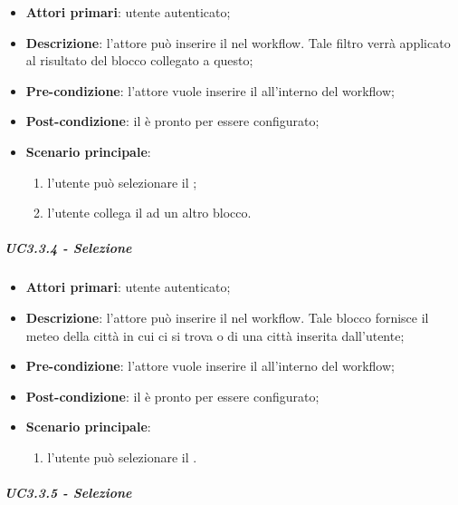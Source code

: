 \begin{itemize}
\item \textbf{Attori primari}:  utente autenticato;

\item \textbf{Descrizione}: l'attore può inserire il \BFiltro{} nel workflow. Tale filtro verrà applicato al risultato del blocco collegato a questo;

\item \textbf{Pre-condizione}: l'attore vuole inserire il \BFiltro{} all'interno del workflow;

\item \textbf{Post-condizione}:  il \BFiltro{} è pronto per essere configurato;

\item \textbf{Scenario principale}:
\begin{enumerate}
\item l'utente può selezionare il \BFiltro{};
\item l'utente collega il \BFiltro{} ad un altro blocco.
\end{enumerate}
\end{itemize}

\subparagraph{UC3.3.4 - Selezione \BMeteo{}}

\begin{itemize}
\item \textbf{Attori primari}: utente autenticato;

\item \textbf{Descrizione}:  l'attore può inserire il \BMeteo{} nel workflow. Tale blocco fornisce il meteo della città in cui ci si trova o di una città inserita dall'utente;

\item \textbf{Pre-condizione}: l'attore vuole inserire il \BMeteo{} all'interno del workflow;

\item \textbf{Post-condizione}: il \BMeteo{} è pronto per essere configurato;

\item \textbf{Scenario principale}:
\begin{enumerate}
\item l'utente può selezionare il \BMeteo{}.

\end{enumerate}
\end{itemize}

\subparagraph{UC3.3.5 - Selezione \BInstagram{}}

